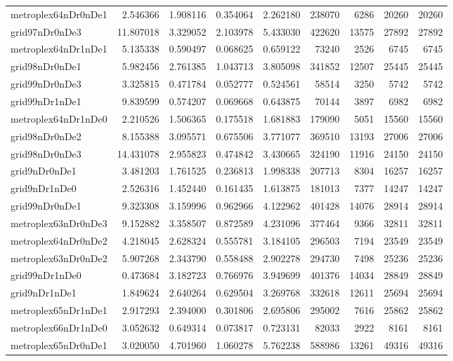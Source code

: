 \documentclass[../../../thesis.tex]{subfiles}
\begin{document}
\begin{longtable}{|l|r|r|r|r|r|r|r|r|}
metroplex64nDr0nDe1 & 2.546366 & 1.908116 & 0.354064 & 2.262180 & 238070 & 6286 & 20260 & 20260 \\
grid97nDr0nDe3 & 11.807018 & 3.329052 & 2.103978 & 5.433030 & 422620 & 13575 & 27892 & 27892 \\
metroplex64nDr1nDe1 & 5.135338 & 0.590497 & 0.068625 & 0.659122 & 73240 & 2526 & 6745 & 6745 \\
grid98nDr0nDe1 & 5.982456 & 2.761385 & 1.043713 & 3.805098 & 341852 & 12507 & 25445 & 25445 \\
grid99nDr0nDe3 & 3.325815 & 0.471784 & 0.052777 & 0.524561 & 58514 & 3250 & 5742 & 5742 \\
grid99nDr1nDe1 & 9.839599 & 0.574207 & 0.069668 & 0.643875 & 70144 & 3897 & 6982 & 6982 \\
metroplex64nDr1nDe0 & 2.210526 & 1.506365 & 0.175518 & 1.681883 & 179090 & 5051 & 15560 & 15560 \\
grid98nDr0nDe2 & 8.155388 & 3.095571 & 0.675506 & 3.771077 & 369510 & 13193 & 27006 & 27006 \\
grid98nDr0nDe3 & 14.431078 & 2.955823 & 0.474842 & 3.430665 & 324190 & 11916 & 24150 & 24150 \\
grid9nDr0nDe1 & 3.481203 & 1.761525 & 0.236813 & 1.998338 & 207713 & 8304 & 16257 & 16257 \\
grid9nDr1nDe0 & 2.526316 & 1.452440 & 0.161435 & 1.613875 & 181013 & 7377 & 14247 & 14247 \\
grid99nDr0nDe1 & 9.323308 & 3.159996 & 0.962966 & 4.122962 & 401428 & 14076 & 28914 & 28914 \\
metroplex63nDr0nDe3 & 9.152882 & 3.358507 & 0.872589 & 4.231096 & 377464 & 9366 & 32811 & 32811 \\
metroplex64nDr0nDe2 & 4.218045 & 2.628324 & 0.555781 & 3.184105 & 296503 & 7194 & 23549 & 23549 \\
metroplex63nDr0nDe2 & 5.907268 & 2.343790 & 0.558488 & 2.902278 & 294730 & 7498 & 25236 & 25236 \\
grid99nDr1nDe0 & 0.473684 & 3.182723 & 0.766976 & 3.949699 & 401376 & 14034 & 28849 & 28849 \\
grid9nDr1nDe1 & 1.849624 & 2.640264 & 0.629504 & 3.269768 & 332618 & 12611 & 25694 & 25694 \\
metroplex65nDr1nDe1 & 2.917293 & 2.394000 & 0.301806 & 2.695806 & 295002 & 7616 & 25862 & 25862 \\
metroplex66nDr1nDe0 & 3.052632 & 0.649314 & 0.073817 & 0.723131 & 82033 & 2922 & 8161 & 8161 \\
metroplex65nDr0nDe1 & 3.020050 & 4.701960 & 1.060278 & 5.762238 & 588986 & 13261 & 49316 & 49316 \\

\end{longtable}
\end{document}
